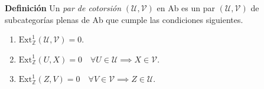 \documentclass[preview]{standalone}
\begin{document}
\begin{center}
\justifying \textbf{Definición} Un \emph{par de cotorsión} $(\mathcal{U}, \mathcal{V})$ en Ab es un par $(\mathcal{U}, \mathcal{V})$ de subcategorías plenas de Ab que cumple las condiciones siguientes.\begin{enumerate} \item $\text{Ext}^1_\mathbb{Z} (\mathcal{U}, \mathcal{V}) = 0$. \item $\text{Ext}^1_\mathbb{Z} (U, X) = 0 \quad \forall U\in\mathcal{U} \implies X\in\mathcal{V}$. \item $\text{Ext}^1_\mathbb{Z} (Z, V) = 0 \quad \forall V\in\mathcal{V} \implies Z\in\mathcal{U}$. \end{enumerate}
\end{center}
\end{document}
